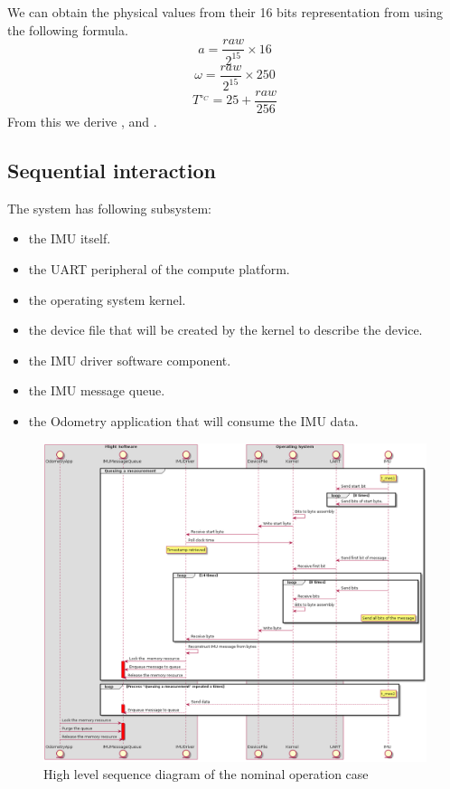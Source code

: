 We can obtain the physical values from their 16 bits representation from using the following formula.
\begin{equation}
    a = \frac{raw}{2^{15}} \times 16
\end{equation}
\begin{equation}
    \omega = \frac{raw}{2^{15}} \times 250
\end{equation}
\begin{equation}
    T^{\circ_C} = 25+\frac{raw}{256}
\end{equation}
From this we derive ,  and .


\subsection{Sequential interaction}
The system has following subsystem:
\begin{itemize}
    \item the IMU itself.
    \item the UART peripheral of the compute platform.
    \item the operating system kernel.
    \item the device file that will be created by the kernel to describe the device.
    \item the IMU driver software component.
    \item the IMU message queue.
    \item the Odometry application that will consume the IMU data.
\end{itemize}

\begin{figure}[H]
    \centering
    \includegraphics[width=1.0 \textwidth]{diagrams/high_level_sys_overview.png}
    \caption{High level sequence diagram of the nominal operation case}
    \label{fig-high-level-nominal}
\end{figure}

